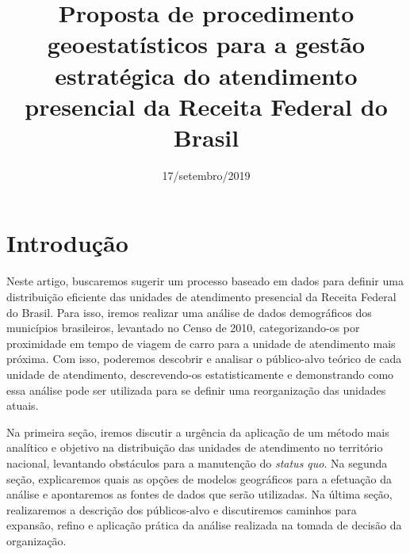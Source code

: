 \documentclass[]{article}
\title{Proposta de procedimento geoestatísticos para a gestão estratégica do
atendimento presencial da Receita Federal do Brasil}
\author{}
\date{17/setembro/2019}
\newenvironment{Shaded}{\begin{snugshade}}{\end{snugshade}}
\newcommand{\DataTypeTok}[1]{\textcolor[rgb]{0.13,0.29,0.53}{#1}}
\newcommand{\KeywordTok}[1]{\textcolor[rgb]{0.13,0.29,0.53}{\textbf{#1}}}
\newcommand{\NormalTok}[1]{#1}
\newcommand{\OperatorTok}[1]{\textcolor[rgb]{0.81,0.36,0.00}{\textbf{#1}}}
\newcommand{\StringTok}[1]{\textcolor[rgb]{0.31,0.60,0.02}{#1}}
\begin{document}
\maketitle

\renewcommand\refname{Referências}

\begin{Shaded}
\end{Shaded}

\hypertarget{introducao}{%
\section{Introdução}\label{introducao}}

Neste artigo, buscaremos sugerir um processo baseado em dados para
definir uma distribuição eficiente das unidades de atendimento
presencial da Receita Federal do Brasil. Para isso, iremos realizar uma
análise de dados demográficos dos municípios brasileiros, levantado no
Censo de 2010, categorizando-os por proximidade em tempo de viagem de
carro para a unidade de atendimento mais próxima. Com isso, poderemos
descobrir e analisar o público-alvo teórico de cada unidade de
atendimento, descrevendo-os estatisticamente e demonstrando como essa
análise pode ser utilizada para se definir uma reorganização das
unidades atuais.

Na primeira seção, iremos discutir a urgência da aplicação de um método
mais analítico e objetivo na distribuição das unidades de atendimento no
território nacional, levantando obstáculos para a manutenção do
\emph{status quo}. Na segunda seção, explicaremos quais as opções de
modelos geográficos para a efetuação da análise e apontaremos as fontes
de dados que serão utilizadas. Na última seção, realizaremos a descrição
dos públicos-alvo e discutiremos caminhos para expansão, refino e
aplicação prática da análise realizada na tomada de decisão da
organização.
\end{document}
